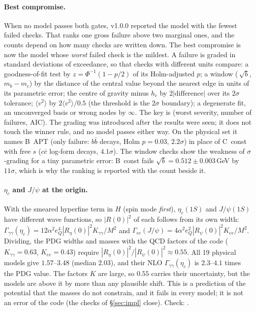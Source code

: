 \documentclass[11pt,a4paper]{article}
\numberwithin{equation}{section}
\theoremstyle{definition}
\theoremstyle{plain}
\theoremstyle{remark}
\numberwithin{algorithm}{section}
\begin{document}
\paragraph{Best compromise.} When no model passes both gates, v1.0.0 reported the model with the fewest failed checks. That ranks one gross failure above two marginal ones, and the counts depend on how many checks are written down. The best compromise is now the model whose \emph{worst} failed check is the mildest. A failure is graded in standard deviations of exceedance, so that checks with different units compare: a goodness-of-fit test by $z=\Phi^{-1}(1-p/2)$ of its Holm-adjusted $p$; a window (\,$\sqrt b$, $m_b-m_c$) by the distance of the central value beyond the nearest edge in units of its parametric error; the centre of gravity minus $h_c$ by $2|\text{difference}|$ over its $2\sigma$ tolerance; $\langle v^2\rangle$ by $2\langle v^2\rangle/0.5$ (the threshold is the $2\sigma$ boundary); a degenerate fit, an unconverged basis or wrong nodes by $\infty$. The key is (worst severity, number of failures, AIC). The grading was introduced after the results were seen; it does not touch the winner rule, and no model passes either way. On the physical set it names B~APT (only failure: $b\bar b$ decays, Holm $p=0.03$, $2.2\sigma$) in place of C~const with free $s$ ($c\bar c$ log-form decays, $4.1\sigma$). The window checks show the weakness of $\sigma$-grading for a tiny parametric error: B~const fails $\sqrt b=0.512\pm0.003$\,GeV by $11\sigma$, which is why the ranking is reported with the count beside it.

\paragraph{$\eta_c$ and $J/\psi$ at the origin.} With the smeared hyperfine term in $H$ (spin mode \emph{first}), $\eta_c(1S)$ and $J/\psi(1S)$ have different wave functions, so $|R(0)|^2$ of each follows from its own width: $\Gamma_{\gamma\gamma}(\eta_c)=12\alpha^2e_Q^4|R_\eta(0)|^2K_{\gamma\gamma}/M^2$ and $\Gamma_{ee}(J/\psi)=4\alpha^2e_Q^2|R_\psi(0)|^2K_{ee}/M^2$. Dividing, the PDG widths and masses with the QCD factors of the code ($K_{\gamma\gamma}=0.63$, $K_{ee}=0.43$) require $|R_\eta(0)|^2/|R_\psi(0)|^2\approx0.55$. All 19 physical models give $1.57$--$3.48$ (median $2.03$), and their NLO $\Gamma_{\gamma\gamma}(\eta_c)$ is $2.3$--$4.1$ times the PDG value. The factors $K$ are large, so $0.55$ carries their uncertainty, but the models are above it by more than any plausible shift. This is a prediction of the potential that the masses do not constrain, and it fails in every model; it is not an error of the code (the checks of \S\ref{sec:impl} close). Check: .
\end{document}
